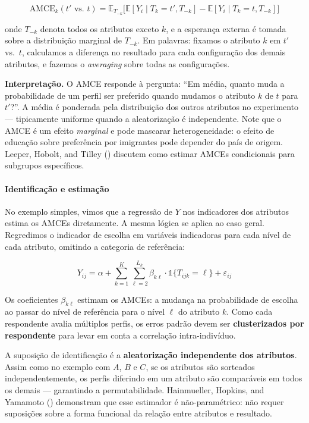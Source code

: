 \documentclass[
]{article}
\begin{document}
\[\text{AMCE}_k(t' \text{ vs. } t) = \mathbb{E}_{T_{-k}}\Big[\mathbb{E}[Y_i \mid T_k = t', T_{-k}] - \mathbb{E}[Y_i \mid T_k = t, T_{-k}]\Big]\]

onde \(T_{-k}\) denota todos os atributos exceto \(k\), e a esperança externa é tomada sobre a distribuição marginal de \(T_{-k}\). Em palavras: fixamos o atributo \(k\) em \(t'\) vs.~\(t\), calculamos a diferença no resultado para cada configuração dos demais atributos, e fazemos o \emph{averaging} sobre todas as configurações.

\textbf{Interpretação.} O AMCE responde à pergunta: ``Em média, quanto muda a probabilidade de um perfil ser preferido quando mudamos o atributo \(k\) de \(t\) para \(t'\)?''. A média é ponderada pela distribuição dos outros atributos no experimento --- tipicamente uniforme quando a aleatorização é independente. Note que o AMCE é um efeito \emph{marginal} e pode mascarar heterogeneidade: o efeito de educação sobre preferência por imigrantes pode depender do país de origem. Leeper, Hobolt, and Tilley () discutem como estimar AMCEs condicionais para subgrupos específicos.

\paragraph{Identificação e estimação}\label{identificauxe7uxe3o-e-estimauxe7uxe3o}

No exemplo simples, vimos que a regressão de \(Y\) nos indicadores dos atributos estima os AMCEs diretamente. A mesma lógica se aplica ao caso geral. Regredimos o indicador de escolha em variáveis indicadoras para cada nível de cada atributo, omitindo a categoria de referência:

\[Y_{ij} = \alpha + \sum_{k=1}^{K} \sum_{\ell=2}^{L_k} \beta_{k\ell} \cdot \mathbb{1}\{T_{ijk} = \ell\} + \varepsilon_{ij}\]

Os coeficientes \(\beta_{k\ell}\) estimam os AMCEs: a mudança na probabilidade de escolha ao passar do nível de referência para o nível \(\ell\) do atributo \(k\). Como cada respondente avalia múltiplos perfis, os erros padrão devem ser \textbf{clusterizados por respondente} para levar em conta a correlação intra-indivíduo.

A suposição de identificação é a \textbf{aleatorização independente dos atributos}. Assim como no exemplo com \(A\), \(B\) e \(C\), se os atributos são sorteados independentemente, os perfis diferindo em um atributo são comparáveis em todos os demais --- garantindo a permutabilidade. Hainmueller, Hopkins, and Yamamoto () demonstram que esse estimador é não-paramétrico: não requer suposições sobre a forma funcional da relação entre atributos e resultado.
\end{document}
